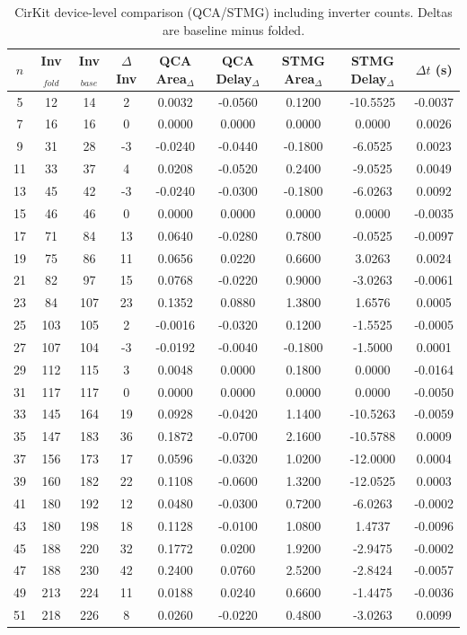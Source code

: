 \begin{table}[t]
\centering
\caption{CirKit device-level comparison (QCA/STMG) including inverter counts. Deltas are baseline minus folded.}
\label{tab:cirkit_qca_stmg}
\begin{tabular}{ccccccccc}
\hline
$n$ & Inv$_{fold}$ & Inv$_{base}$ & $\Delta$Inv & QCA Area$_{\Delta}$ & QCA Delay$_{\Delta}$ & STMG Area$_{\Delta}$ & STMG Delay$_{\Delta}$ & $\Delta t$ (s) \\
\hline
5 & 12 & 14 & 2 & 0.0032 & -0.0560 & 0.1200 & -10.5525 & -0.0037 \\
7 & 16 & 16 & 0 & 0.0000 & 0.0000 & 0.0000 & 0.0000 & 0.0026 \\
9 & 31 & 28 & -3 & -0.0240 & -0.0440 & -0.1800 & -6.0525 & 0.0023 \\
11 & 33 & 37 & 4 & 0.0208 & -0.0520 & 0.2400 & -9.0525 & 0.0049 \\
13 & 45 & 42 & -3 & -0.0240 & -0.0300 & -0.1800 & -6.0263 & 0.0092 \\
15 & 46 & 46 & 0 & 0.0000 & 0.0000 & 0.0000 & 0.0000 & -0.0035 \\
17 & 71 & 84 & 13 & 0.0640 & -0.0280 & 0.7800 & -0.0525 & -0.0097 \\
19 & 75 & 86 & 11 & 0.0656 & 0.0220 & 0.6600 & 3.0263 & 0.0024 \\
21 & 82 & 97 & 15 & 0.0768 & -0.0220 & 0.9000 & -3.0263 & -0.0061 \\
23 & 84 & 107 & 23 & 0.1352 & 0.0880 & 1.3800 & 1.6576 & 0.0005 \\
25 & 103 & 105 & 2 & -0.0016 & -0.0320 & 0.1200 & -1.5525 & -0.0005 \\
27 & 107 & 104 & -3 & -0.0192 & -0.0040 & -0.1800 & -1.5000 & 0.0001 \\
29 & 112 & 115 & 3 & 0.0048 & 0.0000 & 0.1800 & 0.0000 & -0.0164 \\
31 & 117 & 117 & 0 & 0.0000 & 0.0000 & 0.0000 & 0.0000 & -0.0050 \\
33 & 145 & 164 & 19 & 0.0928 & -0.0420 & 1.1400 & -10.5263 & -0.0059 \\
35 & 147 & 183 & 36 & 0.1872 & -0.0700 & 2.1600 & -10.5788 & 0.0009 \\
37 & 156 & 173 & 17 & 0.0596 & -0.0320 & 1.0200 & -12.0000 & 0.0004 \\
39 & 160 & 182 & 22 & 0.1108 & -0.0600 & 1.3200 & -12.0525 & 0.0003 \\
41 & 180 & 192 & 12 & 0.0480 & -0.0300 & 0.7200 & -6.0263 & -0.0002 \\
43 & 180 & 198 & 18 & 0.1128 & -0.0100 & 1.0800 & 1.4737 & -0.0096 \\
45 & 188 & 220 & 32 & 0.1772 & 0.0200 & 1.9200 & -2.9475 & -0.0002 \\
47 & 188 & 230 & 42 & 0.2400 & 0.0760 & 2.5200 & -2.8424 & -0.0057 \\
49 & 213 & 224 & 11 & 0.0188 & 0.0240 & 0.6600 & -1.4475 & -0.0036 \\
51 & 218 & 226 & 8 & 0.0260 & -0.0220 & 0.4800 & -3.0263 & 0.0099 \\
\hline
\end{tabular}
\end{table}
